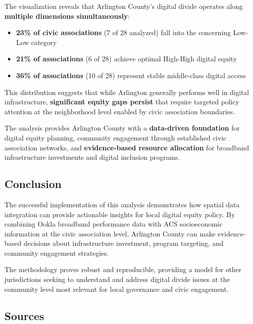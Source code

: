 \documentclass[
  letterpaper,
  DIV=11,
  numbers=noendperiod]{scrartcl}
\providecommand{\tightlist}{%
  \setlength{\itemsep}{0pt}\setlength{\parskip}{0pt}}
\begin{document}
The visualization reveals that Arlington County's digital divide
operates along \textbf{multiple dimensions simultaneously}:

\begin{itemize}
\tightlist
\item
  \textbf{23\% of civic associations} (7 of 28 analyzed) fall into the
  concerning Low-Low category
\item
  \textbf{21\% of associations} (6 of 28) achieve optimal High-High
  digital equity
\item
  \textbf{36\% of associations} (10 of 28) represent stable middle-class
  digital access
\end{itemize}

This distribution suggests that while Arlington generally performs well
in digital infrastructure, \textbf{significant equity gaps persist} that
require targeted policy attention at the neighborhood level enabled by
civic association boundaries.

The analysis provides Arlington County with a \textbf{data-driven
foundation} for digital equity planning, community engagement through
established civic association networks, and \textbf{evidence-based
resource allocation} for broadband infrastructure investments and
digital inclusion programs.

\subsection{Conclusion}\label{conclusion}

The successful implementation of this analysis demonstrates how spatial
data integration can provide actionable insights for local digital
equity policy. By combining Ookla broadband performance data with ACS
socioeconomic information at the civic association level, Arlington
County can make evidence-based decisions about infrastructure
investment, program targeting, and community engagement strategies.

The methodology proves robust and reproducible, providing a model for
other jurisdictions seeking to understand and address digital divide
issues at the community level most relevant for local governance and
civic engagement.

\subsection{Sources}\label{sources}
\end{document}
